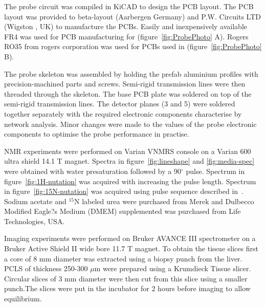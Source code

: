 \documentclass[preprint,12pt]{article}
\begin{document}
The probe circuit was compiled in KiCAD to design the PCB layout. The PCB layout was provided to beta-layout (Aarbergen Germany) and P.W. Circuits LTD (Wigston , UK) to manufacture the PCBs. Easily and inexpensively available FR4 was used for PCB manufacturing for (figure~\ref{fig:ProbePhoto} A). Rogers RO35 from rogers corporation was used for PCBs used in (figure~\ref{fig:ProbePhoto} B).\par
The probe skeleton was assembled by holding the prefab aluminium profiles with precision-machined parts and screws. Semi-rigid transmission lines were then threaded through the skeleton. The base PCB plate was soldered on top of the semi-rigid transmission lines. The detector planes (3 and 5) were soldered together separately with the required electronic components characterise by network analysis. Minor changes were made to the values of the probe electronic components to optimise the probe performance in practise.\par
NMR experiments were performed on Varian VNMRS console on a Varian 600 ultra shield 14.1 T magnet. Spectra in figure~\ref{fig:lineshape} and \ref{fig:media-spec} were obtained with water presaturation followed by a 90$^{\circ}$ pulse. Spectrum in figure~\ref{fig:1H-nutation} was acquired with increasing the pulse length. Spectrum in figure~\ref{fig:15N-nutation} was acquired using pulse sequence described in~\cite{bax_indirect}. Sodium acetate and $^{15}$N labeled urea were purchased from Merek and Dulbecco Modified Eagle?s Medium (DMEM) supplemented was purchased from Life Technologies, USA.\par
Imaging experiments were performed on Bruker AVANCE III spectrometer on a Bruker Active Shield II wide bore 11.7 T magnet. To obtain the tissue slices first a core of 8 mm diameter was extracted using a biopsy punch from the liver. PCLS of thickness 250-300 $\mu$m were prepared using a Krumdieck Tissue slicer. Circular slices of 3 mm diameter were then cut from this slice using a smaller punch.The slices were put in the incubator for 2 hours before imaging to allow equilibrium.
\end{document}
